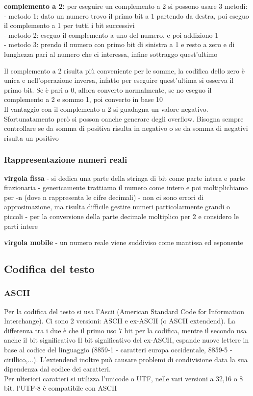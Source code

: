 \documentclass[12pt, a4paper]{article}
\begin{document}
\textbf{complemento a 2:}
per eseguire un complemento a 2 si possono usare 3 metodi:
\\ - metodo 1: dato un numero trovo il primo bit a 1 partendo da destra, poi eseguo il complemento a 1 per tutti i bit successivi
\\ - metodo 2: eseguo il complemento a uno del numero, e poi addiziono 1
\\ - metodo 3: prendo il numero con primo bit di sinistra a 1 e resto a zero e di lunghezza pari al numero che ci interessa, infine sottraggo quest'ultimo

Il complemento a 2 risulta più conveniente per le somme, la codifica dello zero è unica e nell'operazione inversa, infatto per eseguire quest'ultima
si osserva il primo bit. Se è pari a 0, allora converto normalmente, se no eseguo il complemento a 2 e sommo 1, poi converto in base 10
\\Il vantaggio con il complemento a 2 si guadagna un valore negativo. Sfortunatamento però si posson oanche generare degli overflow.
Bisogna sempre controllare se da somma di positiva risulta in negativo o se da somma di negativi risulta un positivo
 


\subsubsection{Rappresentazione numeri reali}
\textbf{virgola fissa}
  - si dedica una parte della stringa di bit come parte intera e parte frazionaria
  - genericamente trattiamo il numero come intero e poi moltiplichiamo per -n (dove n rappresenta le cifre decimali)
  - non ci sono errori di approsimazione, ma risulta difficile gestire numeri particolarmente grandi o piccoli
  - per la conversione della parte decimale moltiplico per 2 e considero le parti intere

\textbf{virgola mobile}
  - un numero reale viene suddiviso come mantissa ed esponente
\newpage
\subsection{Codifica del testo}
\subsubsection{ASCII}
Per la codifica del testo si usa l'Ascii (American Standard Code for Information Interchange).
Ci sono 2 versioni: ASCII
e ex-ASCII (o ASCII extendend). La differenza tra i due è che il primo uso 7 bit per la codifica, mentre il secondo usa anche il bit significativo
Il bit significativo del ex-ASCII, espande nuove lettere in base al codice del linguaggio 
(8859-1 - caratteri europa occidentale, 8859-5 - cirillico,...). L'extendend inoltre può causare problemi di condivisione data
la sua dipendenza dal codice dei caratteri.\\
Per ulteriori caratteri si utilizza l'unicode o UTF, nelle vari versioni a 32,16 o 8 bit. l'UTF-8 è compatibile con ASCII
\end{document}
